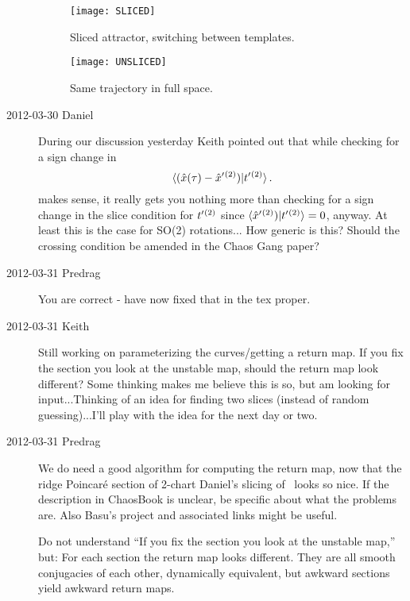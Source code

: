 \begin{description}
\begin{figure}
\begin{center}
  \texttt{[image: SLICED]}
\end{center}
  \caption{
  Sliced attractor, switching between templates.}
\label{fig:sliced}
\end{figure}

\begin{figure}
\begin{center}
  \texttt{[image: UNSLICED]}
\end{center}
  \caption{
  Same trajectory in full space.}
\label{fig:unsliced}
\end{figure}


\item[2012-03-30 Daniel]
During our discussion yesterday Keith pointed out that while checking for
a sign change in
\[
\braket{(\sspRed(\zeit)- \slicep{}^{(2)})}{\sliceTan{}{}^{(2)}}
\,.
\]
makes sense, it really gets you nothing more than checking for a sign
change in the slice condition for $t'_{}{}^{(2)}$ since
$\braket{\slicep{}^{(2)})}{\sliceTan{}{}^{(2)}} = 0$, anyway. At least
this is the case for SO(2) rotations... How generic is this? Should the
crossing condition be amended in the Chaos Gang paper?

\item[2012-03-31 Predrag] You are correct - have now fixed that in the
tex proper.

\item[2012-03-31 Keith] Still working on parameterizing the
curves/getting a return map.  If you fix the section you look at the
unstable map, should the return map look different?  Some thinking makes
me believe this is so, but am looking for input...Thinking of an idea for
finding two slices (instead of random guessing)...I'll play with the idea
for the next day or two.

\item[2012-03-31 Predrag] We do need a good algorithm for computing the
return map, now that the ridge Poincar\'e section of 2-chart Daniel's
slicing of \cLe\ looks so nice. If the description in ChaosBook is
unclear, be specific about what the problems are. Also
{Basu's project} and associated links might be useful.

Do not understand ``If you fix the section you look at the unstable
map,'' but: For each section the return map looks different. They are all
smooth conjugacies of each other, dynamically equivalent, but awkward
sections yield awkward return maps.


\end{description}
